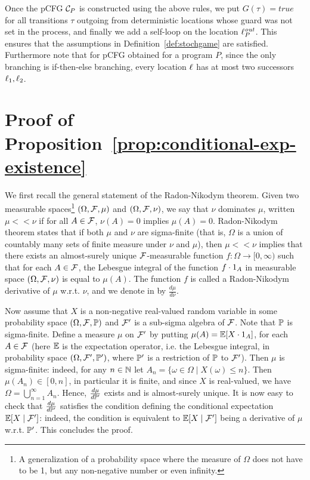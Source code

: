 Once the pCFG $\mathcal{C}_P$ is constructed using the above rules, we put
$G(\tau)=\textit{true}$ for all transitions $\tau$ outgoing from deterministic
locations whose guard was not set in the process, and finally we add a self-loop
on the location $\ell^{\mathit{out}}_P$. This ensures that the assumptions in
Definition~\ref{def:stochgame} are satisfied.
Furthermore note that for pCFG obtained for a program $P$, since the only
branching is if-then-else branching, every location $\ell$ has at most two
successors $\ell_1,\ell_2$.

\def\xx{\ref{prop:conditional-exp-existence}}

\section{Proof of Proposition~\xx}

We first recall the general statement of the Radon-Nikodym theorem. Given two measurable spaces\footnote{A generalization of a probability space where the measure of $\Omega$ does not have to be 1, but any non-negative number or even infinity.} $(\Omega,\mathcal{F},\mu)$ and $(\Omega,\mathcal{F},\nu)$, we say that $\nu$ dominates $\mu$, written $\mu<<\nu$ if for all $A\in \mathcal{F}$, $\nu(A)=0$ implies $\mu(A)=0$. Radon-Nikodym theorem states that if both $\mu$ and $\nu$ are sigma-finite (that is, $\Omega$ is a union of countably many sets of finite measure under $\nu$ and $\mu$), then $\mu<<\nu$ implies that there exists an almost-surely unique $\mathcal{F}$-measurable function $f\colon \Omega\rightarrow [0,\infty)$ such that for each $A \in\mathcal{F}$, the Lebesgue integral of the function $f\cdot{1}_{A}$ in measurable space  $(\Omega,\mathcal{F},\nu)$ is equal to $\mu(A)$. The function $f$ is called a Radon-Nikodym derivative of $\mu$ w.r.t. $\nu$, and we denote in by $\frac{d\mu}{d\nu}$.

Now assume that $X$ is a non-negative real-valued random variable in some probability space $(\Omega,\mathcal{F},\mathbb{P})$ and $\mathcal{F}'$ is a sub-sigma algebra of $\mathcal{F}$. Note that $\mathbb{P}$ is sigma-finite. Define a measure $\mu$ on $\mathcal{F}'$ by putting $\mu(A)=\mathbb{E}[X\cdot{1}_{A}]$, for each $A\in \mathcal{F}$ (here $\mathbb{E}$ is the expectation operator, i.e. the Lebesgue integral, in probability space $(\Omega,\mathcal{F}',\mathbb{P}')$, where $\mathbb{P}'$ is a restriction of $\mathbb{P}$ to $\mathcal{F}'$). Then $\mu$ is sigma-finite: indeed, for any $n\in \mathbb{N}$ let $A_n = \{\omega\in\Omega\mid X(\omega)\leq n\}$. Then $\mu(A_n)\in [0,n]$, in particular it is finite, and since $X$ is real-valued, we have $\Omega=\bigcup_{n=1}^{\infty} A_n$. Hence, $\frac{d\mu}{d\mathbb{P}'}$ exists and is almost-surely unique. It is now easy to check that $\frac{d\mu}{d\mathbb{P}'}$ satisfies the condition defining the conditional expectation $\mathbb{E}[X\mid \mathcal{F}']$: indeed, the condition is equivalent to $\mathbb{E}[X\mid \mathcal{F}']$ being a derivative of $\mu$ w.r.t. $\mathbb{P}'$. This concludes the proof.

